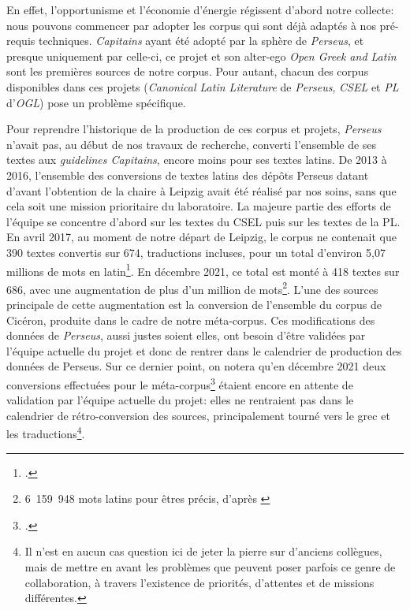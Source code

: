En effet, l'opportunisme et l'économie d'énergie régissent d'abord notre collecte: nous pouvons commencer par adopter les corpus qui sont déjà adaptés à nos pré-requis techniques. \textit{Capitains} ayant été adopté par la sphère de \textit{Perseus}, et presque uniquement par celle-ci, ce projet et son alter-ego \textit{Open Greek and Latin} sont les premières sources de notre corpus. Pour autant, chacun des corpus disponibles dans ces projets (\textit{Canonical Latin Literature} de \textit{Perseus}, \textit{CSEL} et \textit{PL} d'\textit{OGL}) pose un problème spécifique.

Pour reprendre l'historique de la production de ces corpus et projets, \textit{Perseus} n'avait pas, au début de nos travaux de recherche, converti l'ensemble de ses textes aux \textit{guidelines Capitains}, encore moins pour ses textes latins. De 2013 à 2016, l'ensemble des conversions de textes latins des dépôts Perseus datant d'avant l'obtention de la chaire à Leipzig avait été réalisé par nos soins, sans que cela soit une mission prioritaire du laboratoire. La majeure partie des efforts de l'équipe se concentre d'abord sur les textes du CSEL puis sur les textes de la PL. En avril 2017, au moment de notre départ de Leipzig, le corpus ne contenait que 390 textes convertis sur 674, traductions incluses, pour un total d'environ 5,07 millions de mots en latin\footcite{travis_hook_2017, travis_hook_2017_logs}. En décembre 2021, ce total est monté à 418 textes sur 686, avec une augmentation de plus d'un million de mots\footnote{6~159~948 mots latins pour êtres précis, d'après \textcite{travis_hook_2021_logs}}. L'une des sources principale de cette augmentation est la conversion de l'ensemble du corpus de Cicéron, produite dans le cadre de notre méta-corpus. Ces modifications des données de \textit{Perseus}, aussi justes soient elles, ont besoin d'être validées par l'équipe actuelle du projet et donc de rentrer dans le calendrier de production des données de Perseus. Sur ce dernier point, on notera qu'en décembre 2021 deux conversions effectuées pour le méta-corpus\footcite{noauthor_pull_nodate} étaient encore en attente de validation par l'équipe actuelle du projet: elles ne rentraient pas dans le calendrier de rétro-conversion des sources, principalement tourné vers le grec et les traductions\footnote{Il n'est en aucun cas question ici de jeter la pierre sur d'anciens collègues, mais de mettre en avant les problèmes que peuvent poser parfois ce genre de collaboration, à travers l'existence de priorités, d'attentes et de missions différentes.}. 


